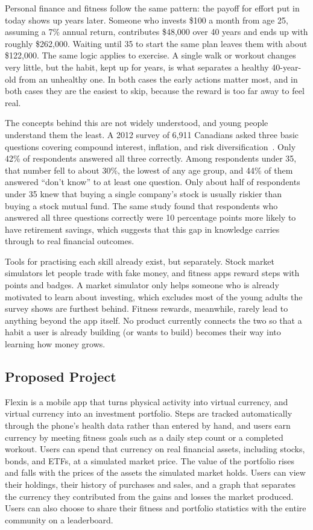\documentclass{article}
\newcommand{\productname}{Flexin}
\begin{document}
Personal finance and fitness follow the same pattern: the payoff for effort put
in today shows up years later. Someone who invests \$100 a month from age 25,
assuming a 7\% annual return, contributes \$48,000 over 40 years and ends up with
roughly \$262,000. Waiting until 35 to start the same plan leaves them with about
\$122,000. The same logic applies to exercise. A single walk or workout changes
very little, but the habit, kept up for years, is what separates a healthy
40-year-old from an unhealthy one. In both cases the early actions matter most,
and in both cases they are the easiest to skip, because the reward is too far
away to feel real.

The concepts behind this are not widely understood, and young people understand
them the least. A 2012 survey of 6,911 Canadians asked three basic questions
covering compound interest, inflation, and risk diversification~\cite{boisclair2017}. 
Only 42\% of respondents answered all three correctly.
Among respondents under 35, that number fell to about 30\%, the lowest of any
age group, and 44\% of them answered ``don't know'' to at least one question.
Only about half of respondents under 35 knew that buying a single company's
stock is usually riskier than buying a stock mutual fund. The same study found
that respondents who answered all three questions correctly were 10 percentage
points more likely to have retirement savings, which suggests that this gap in
knowledge carries through to real financial outcomes.

Tools for practising each skill already exist, but separately. Stock market
simulators let people trade with fake money, and fitness apps reward steps with
points and badges. A market simulator only helps someone who is already
motivated to learn about investing, which excludes most of the young adults the
survey shows are furthest behind. Fitness rewards, meanwhile, rarely lead to
anything beyond the app itself. No product currently connects the two so that a
habit a user is already building (or wants to build) becomes their way into
learning how money grows.

\subsection{Proposed Project}

\productname{} is a mobile app that turns physical activity into virtual
currency, and virtual currency into an investment portfolio. Steps are tracked
automatically through the phone's health data rather than entered by hand, and
users earn currency by meeting fitness goals such as a daily step count or a
completed workout. Users can spend that currency on real financial assets,
including stocks, bonds, and ETFs, at a simulated market price. The value of
the portfolio rises and falls with the prices of the assets the simulated market holds.
Users can view their holdings, their history of purchases and sales, and
a graph that separates the currency they contributed from the gains and losses
the market produced. Users can also choose to share their fitness and portfolio
statistics with the entire community on a leaderboard. 
\end{document}
